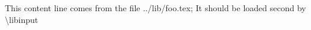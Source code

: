 This content line comes from the file \textsf{../lib/foo.tex}; It should be
loaded second by \textsf{\textbackslash libinput}\par
